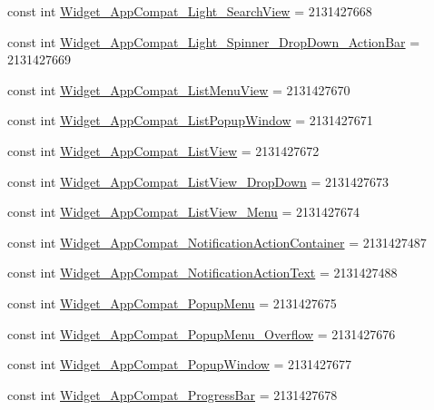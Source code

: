 \begin{CompactItemize}
const int \hyperlink{class__2doo_1_1_droid_1_1_resource_1_1_style_99850062ae98fdc039a660937a5dd723}{Widget\_\-AppCompat\_\-Light\_\-SearchView} = 2131427668
\item 
const int \hyperlink{class__2doo_1_1_droid_1_1_resource_1_1_style_fb3c4de00547cd34a380fbcc730cadeb}{Widget\_\-AppCompat\_\-Light\_\-Spinner\_\-DropDown\_\-ActionBar} = 2131427669
\item 
const int \hyperlink{class__2doo_1_1_droid_1_1_resource_1_1_style_82c17ba93f75a5377ff4600075f2a094}{Widget\_\-AppCompat\_\-ListMenuView} = 2131427670
\item 
const int \hyperlink{class__2doo_1_1_droid_1_1_resource_1_1_style_6afc8f6da7ebeb8567339dcbd2532b25}{Widget\_\-AppCompat\_\-ListPopupWindow} = 2131427671
\item 
const int \hyperlink{class__2doo_1_1_droid_1_1_resource_1_1_style_7b6fdc60812f115316503ee7966e1f68}{Widget\_\-AppCompat\_\-ListView} = 2131427672
\item 
const int \hyperlink{class__2doo_1_1_droid_1_1_resource_1_1_style_3c85de00fb72441c6f88dcd9817bc8c5}{Widget\_\-AppCompat\_\-ListView\_\-DropDown} = 2131427673
\item 
const int \hyperlink{class__2doo_1_1_droid_1_1_resource_1_1_style_c8cf13ee37d4ac1e33a1ffcc991fa734}{Widget\_\-AppCompat\_\-ListView\_\-Menu} = 2131427674
\item 
const int \hyperlink{class__2doo_1_1_droid_1_1_resource_1_1_style_6dde1fdbf03b8d9814fd5ae150c19429}{Widget\_\-AppCompat\_\-NotificationActionContainer} = 2131427487
\item 
const int \hyperlink{class__2doo_1_1_droid_1_1_resource_1_1_style_3d29ac114b74d592a49475441670198f}{Widget\_\-AppCompat\_\-NotificationActionText} = 2131427488
\item 
const int \hyperlink{class__2doo_1_1_droid_1_1_resource_1_1_style_7ff2d73a91ca21fd10412da83c167298}{Widget\_\-AppCompat\_\-PopupMenu} = 2131427675
\item 
const int \hyperlink{class__2doo_1_1_droid_1_1_resource_1_1_style_edb7548ba0b501be1d6e711034013d18}{Widget\_\-AppCompat\_\-PopupMenu\_\-Overflow} = 2131427676
\item 
const int \hyperlink{class__2doo_1_1_droid_1_1_resource_1_1_style_c54d9ad1abc0a32bf87feb3619a45c14}{Widget\_\-AppCompat\_\-PopupWindow} = 2131427677
\item 
const int \hyperlink{class__2doo_1_1_droid_1_1_resource_1_1_style_791877ac25949b178b03ed8de0f010a8}{Widget\_\-AppCompat\_\-ProgressBar} = 2131427678
\item 

\end{CompactItemize}
